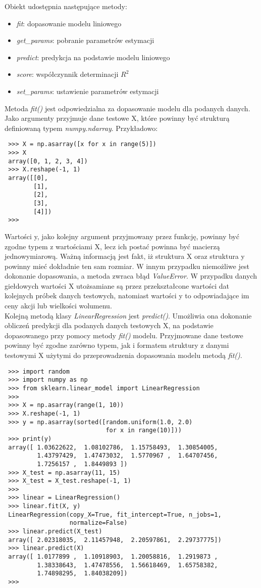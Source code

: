 Obiekt udostępnia następujące metody:
\begin{itemize}
 \item \textit{fit}: dopasowanie modelu liniowego
 \item \textit{get\_params}: pobranie parametrów estymacji
 \item \textit{predict}: predykcja na podstawie modelu liniowego
 \item \textit{score}: współczynnik determinacji $R^2$
 \item \textit{set\_params}: ustawienie parametrów estymacji\\
\end{itemize}

Metoda \textit{fit()} jest odpowiedzialna za dopasowanie modelu dla podanych danych. Jako argumenty przyjmuje dane testowe X, które powinny być strukturą definiowaną typem \textit{numpy.ndarray}. Przykładowo:
\begin{lstlisting}
 >>> X = np.asarray([x for x in range(5)])
 >>> X
 array([0, 1, 2, 3, 4])
 >>> X.reshape(-1, 1)
 array([[0],
        [1],
        [2],
        [3],
        [4]])
 >>>
\end{lstlisting}
Wartości y, jako kolejny argument przyjmowany przez funkcję, powinny być zgodne typem z wartościami X, lecz ich postać powinna być macierzą jednowymiarową.
Ważną informacją jest fakt, iż struktura X oraz struktura y powinny mieć dokładnie ten sam rozmiar. W innym przypadku niemożliwe jest dokonanie dopasowania, a metoda zwraca błąd \textit{ValueError}.
W przypadku danych giełdowych wartości X utożsamiane są przez przekształcone wartości dat kolejnych próbek danych testowych, natomiast wartości y to odpowiadające im ceny akcji lub wielkości wolumenu.\\

Kolejną metodą klasy \textit{LinearRegression} jest \textit{predict()}. Umożliwia ona dokonanie obliczeń predykcji dla podanych danych testowych X, na podstawie dopasowanego przy pomocy metody \textit{fit()} modelu.
Przyjmowane dane testowe powinny być zgodne zarówno typem, jak i formatem struktury z danymi testowymi X użytymi do przeprowadzenia dopasowania modelu metodą \textit{fit()}.

\begin{lstlisting}
 >>> import random
 >>> import numpy as np
 >>> from sklearn.linear_model import LinearRegression
 >>>
 >>> X = np.asarray(range(1, 10))
 >>> X.reshape(-1, 1)
 >>> y = np.asarray(sorted([random.uniform(1.0, 2.0)
                            for x in range(10)]))
 >>> print(y)
 array([ 1.03622622,  1.08102786,  1.15758493,  1.30854005,
         1.43797429,  1.47473032,  1.5770967 ,  1.64707456,
         1.7256157 ,  1.8449893 ])
 >>> X_test = np.asarray(11, 15)
 >>> X_test = X_test.reshape(-1, 1)
 >>>
 >>> linear = LinearRegression()
 >>> linear.fit(X, y)
 LinearRegression(copy_X=True, fit_intercept=True, n_jobs=1,
                  normalize=False)
 >>> linear.predict(X_test)
 array([ 2.02318035,  2.11457948,  2.20597861,  2.29737775])
 >>> linear.predict(X)
 array([ 1.0177899 ,  1.10918903,  1.20058816,  1.2919873 ,
         1.38338643,  1.47478556,  1.56618469,  1.65758382,
         1.74898295,  1.84038209])
 >>>
\end{lstlisting}


